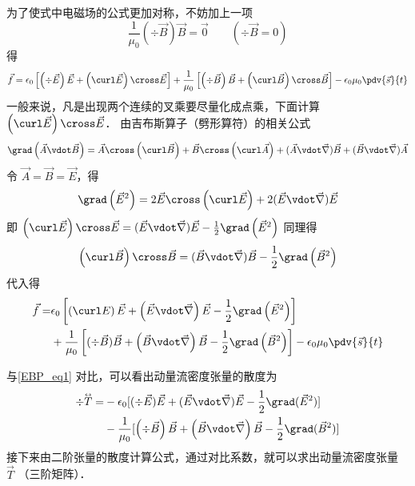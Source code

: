 为了使式中电磁场的公式更加对称，不妨加上一项
\begin{equation}
\frac{1}{{{\mu _0}}}\left( {\div \vec B} \right)\vec B = \vec 0
\qquad
(\div \vec B = 0)
\end{equation} 
得
\begin{equation}
\vec f = {\epsilon_0}\left[ {\left( {\div \vec E} \right)\vec E + \left( {\curl \vec E} \right) \cross \vec E} \right] + \frac{1}{{{\mu _0}}}\left[ {\left( {\div \vec B} \right)\vec B + \left( {\curl \vec B} \right) \cross \vec B} \right] - {\epsilon_0}{\mu _0} \pdv{\vec s}{t}
\end{equation}  
一般来说，凡是出现两个连续的叉乘要尽量化成点乘，下面计算 $\left( {\curl \vec E} \right) \cross \vec E$． 
由吉布斯算子（劈形算符）的相关公式
\begin{equation}
\grad \left( {\vec A \vdot \vec B} \right) = \vec A \cross \left( {\curl \vec B} \right) + \vec B \cross \left( {\curl \vec A} \right) + (\vec A\vdot\vec\nabla )\vec B + (\vec B\vdot\vec\nabla)\vec A
\end{equation} 
令 $\vec A = \vec B = \vec E$，得
\begin{equation}
\grad \left( {{{\vec E}^2}} \right) = 2\vec E \cross \left( {\curl \vec E} \right) + 2(\vec E\vdot\vec\nabla )\vec E
\end{equation} 
即 $\left( {\curl \vec E} \right) \cross \vec E = (\vec E\vdot\vec\nabla)\vec E - \frac{1}{2}\grad \left( {{{\vec E}^2}} \right)$
同理得
\begin{equation}
\left( {\curl \vec B} \right) \cross \vec B = ( \vec B\vdot\vec\nabla )\vec B - \frac{1}{2}\grad \left( {{{\vec B}^2}} \right)
\end{equation} 
代入得
\begin{equation}
\begin{aligned}
\vec f = &{\epsilon_0}\left[ {\left( {\curl E} \right)\vec E + \left( {\vec E\vdot\vec\nabla } \right)\vec E - \frac{1}{2}\grad \left( {{{\vec E}^2}} \right)} \right]\\
&+ \frac{1}{{{\mu _0}}}\left[ {( {\div \vec B} )\vec B + \left( {\vec B\vdot\vec\nabla } \right)\vec B - \frac{1}{2}\grad \left( {{{\vec B}^2}} \right)} \right] - {\epsilon_0}{\mu _0} \pdv{\vec s}{t}
\end{aligned}
\end{equation} 

与\autoref{EBP_eq1} 对比，可以看出动量流密度张量的散度为
\begin{equation}
\begin{aligned}
\div \mathord{\buildrel{\lower3pt\hbox{$\scriptscriptstyle\leftrightarrow$}} 
\over T}  =  &- {\epsilon_0} [ ( \div \vec E )\vec E + (\vec E\vdot\vec\nabla )\vec E - \frac{1}{2}\grad ( {\vec E}^2 ) ]\\
&- \frac{1}{\mu _0} [ \left( {\div \vec B} \right)\vec B + \left( {\vec B\vdot\vec\nabla } \right)\vec B - \frac{1}{2}\grad ({\vec B}^2 ) ]
\end{aligned}
\end{equation} 
接下来由二阶张量的散度计算公式，通过对比系数，就可以求出动量流密度张量 $\vec T$ （三阶矩阵）．

